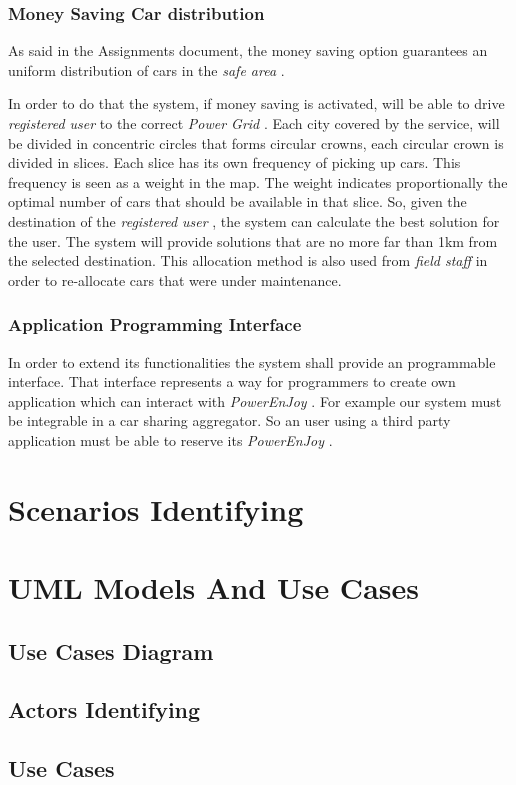 \documentclass[english]{article}
\newcommand{\powerenjoy}{\textit{PowerEnJoy }}
\newcommand{\registereduser}{\textit {registered user }}
\newcommand{\safearea}{\textit{safe area }}
\newcommand{\powergrid}{\textit{Power Grid }}
\newcommand{\fieldstaff}{\textit{field staff }}
\begin{document}
\begin{itemize}
		\subsubsection{Money Saving Car distribution}
		As said in the Assignments document, the money saving option guarantees an uniform distribution of cars in the \safearea.\par In order to do that the system, if money saving is activated, will be able to drive \registereduser to the correct \powergrid. Each city covered by the service, will be divided in concentric circles that forms circular crowns, each circular crown is divided in slices. Each slice has its own frequency of picking up cars. This frequency is seen as a weight in the map. The weight indicates proportionally the optimal number of cars that should be available in that slice. So, given the destination of the \registereduser, the system can calculate the best solution for the user.
The system will provide solutions that are no more far than 1km from the selected destination.
This allocation method is also used from \fieldstaff in order to re-allocate cars that were under maintenance.
		

		\subsubsection{Application Programming Interface}
		In order to extend its functionalities the system shall provide an programmable interface. That interface represents a way for programmers to create own application which can interact with \powerenjoy. For example our system must be integrable in a car sharing aggregator. So an user using a third party application must be able to reserve its \powerenjoy.
		

\section{Scenarios Identifying}
\section{UML Models And Use Cases}
	\subsection{Use Cases Diagram}
	\subsection{Actors Identifying}
	\subsection{Use Cases}


\end{itemize}
\end{document}
